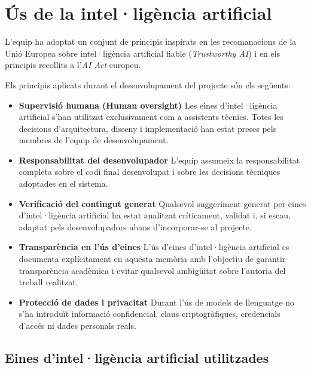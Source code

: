 \section{Ús de la intel·ligència artificial}

L'equip ha adoptat un conjunt de principis inspirats en les recomanacions de la Unió Europea sobre intel·ligència artificial fiable (\textit{Trustworthy AI}) i en els principis recollits a l'\textit{AI Act} europeu.

Els principis aplicats durant el desenvolupament del projecte són els següents:

\begin{itemize}

\item \textbf{Supervisió humana (Human oversight)}  
Les eines d'intel·ligència artificial s'han utilitzat exclusivament com a assistents tècnics. Totes les decisions d'arquitectura, disseny i implementació han estat preses pels membres de l'equip de desenvolupament.

\item \textbf{Responsabilitat del desenvolupador}  
L'equip assumeix la responsabilitat completa sobre el codi final desenvolupat i sobre les decisions tècniques adoptades en el sistema.

\item \textbf{Verificació del contingut generat}  
Qualsevol suggeriment generat per eines d'intel·ligència artificial ha estat analitzat críticament, validat i, si escau, adaptat pels desenvolupadors abans d'incorporar-se al projecte.

\item \textbf{Transparència en l'ús d'eines}
L'ús d'eines d'intel·ligència artificial es documenta explícitament en aquesta memòria amb l'objectiu de garantir transparència acadèmica i evitar qualsevol ambigüitat sobre l'autoria del treball realitzat.

\item \textbf{Protecció de dades i privacitat}  
Durant l'ús de models de llenguatge no s'ha introduït informació confidencial, claus criptogràfiques, credencials d'accés ni dades personals reals.

\end{itemize}

\subsection{Eines d'intel·ligència artificial utilitzades}

